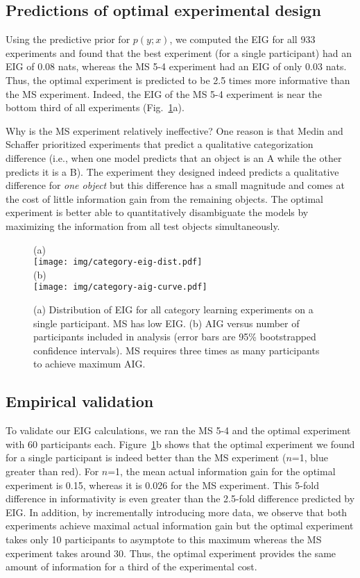 \documentclass[10pt,letterpaper]{article}
\begin{document}
\subsection{Predictions of optimal experimental design}

Using the predictive prior for $p(y; x)$, we computed the EIG for all 933 experiments and found that the best experiment (for a single participant) had an EIG of 0.08 nats, whereas the MS 5-4 experiment had an EIG of only 0.03 nats.
Thus, the optimal experiment is predicted to be 2.5 times more informative than the MS experiment.
Indeed, the EIG of the MS 5-4 experiment is near the bottom third of all experiments (Fig.~\ref{fig:dist}a).

Why is the MS experiment relatively ineffective?
One reason is that Medin and Schaffer prioritized experiments that predict a qualitative categorization difference (i.e., when one model predicts that an object is an A while the other predicts it is a B).
The experiment they designed indeed predicts a qualitative difference for \emph{one object} but this difference has a small magnitude and comes at the cost of little information gain from the remaining objects.
The optimal experiment is better able to quantitatively disambiguate the models by maximizing the information from all test objects simultaneously.

\begin{figure}[t]
(a) \\
\texttt{[image: img/category-eig-dist.pdf]}\\
(b) \\
\texttt{[image: img/category-aig-curve.pdf]}
\caption{(a) Distribution of EIG for all category learning experiments on a single participant. MS has low EIG. (b) AIG versus number of participants included in analysis (error bars are 95\% bootstrapped confidence intervals). MS requires three times as many participants to achieve maximum AIG.}
\label{fig:dist}
\end{figure}

\subsection{Empirical validation}

To validate our EIG calculations, we ran the MS 5-4 and the optimal experiment with 60 participants each.
Figure~\ref{fig:dist}b shows that the optimal experiment we found for a single participant is indeed better than the MS experiment ($n$=1, blue greater than red).
For $n$=1, the mean actual information gain for the optimal experiment is 0.15, whereas it is 0.026 for the MS experiment.
This 5-fold difference in informativity is even greater than the 2.5-fold difference predicted by EIG.
In addition, by incrementally introducing more data, we observe that both experiments achieve maximal actual information gain but the optimal experiment takes only 10 participants to asymptote to this maximum whereas the MS experiment takes around 30.
Thus, the optimal experiment provides the same amount of information for a third of the experimental cost.
\end{document}
